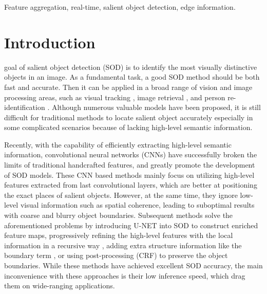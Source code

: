 \documentclass[journal]{IEEEtran}
\begin{document}
\begin{IEEEkeywords}
Feature aggregation, real-time, salient object detection, edge information.
\end{IEEEkeywords}


\IEEEpeerreviewmaketitle



\section{Introduction}

 goal of salient object detection (SOD) is to identify the most visually distinctive objects in an image. As a fundamental task, a good SOD method should be both fast and accurate. Then it can be applied in a broad range of vision and image processing areas, such as visual tracking \cite{DBLP:journals/pami/MahadevanV13,DBLP:conf/icml/HongYKH15}, image retrieval \cite{DBLP:conf/cvpr/HeFLCLCC12}, and person re-identification \cite{DBLP:conf/cvpr/ZhaoOW13}. Although numerous valuable models have been proposed, it is still difficult for traditional methods to locate salient object accurately especially in some complicated scenarios because of lacking high-level semantic information. 

Recently, with the capability of efficiently extracting high-level semantic information, convolutional neural networks (CNNs) have successfully broken the limits of traditional handcrafted features, and greatly promote the development of SOD models. These CNN based methods\cite{DBLP:conf/iccv/ZhangWLWY17,DBLP:conf/cvpr/LeeTK16} mainly focus on utilizing high-level features extracted from last convolutional layers, which are better at positioning the exact places of salient objects. However, at the same time, they ignore low-level visual information such as spatial coherence, leading to suboptimal results with coarse and blurry object boundaries.
Subsequent methods \cite{DBLP:conf/cvpr/LiuH16,DBLP:conf/iccv/ZhangWLWR17,DBLP:journals/tip/ZhangLLS19,DBLP:journals/pami/HouCHBTT19} solve the aforementioned problems by introducing U-NET \cite{DBLP:conf/miccai/RonnebergerFB15} into SOD to construct enriched feature maps, progressively refining the high-level features with the local information in a recursive way \cite{DBLP:conf/eccv/WangWLZR16,DBLP:conf/cvpr/ZhangWQLW18}, adding extra structure information like the boundary term \cite{DBLP:journals/spl/ZhugeYZL18,DBLP:journals/spl/GuanWQZL19,DBLP:conf/cvpr/LiuHCFJ19}, or using post-processing (CRF) \cite{DBLP:conf/cvpr/LiY16,DBLP:journals/pami/HouCHBTT19} to preserve the object boundaries. While these methods have achieved excellent SOD accuracy, the main inconvenience with these approaches is their low inference speed, which drag them on wide-ranging applications.
\end{document}
